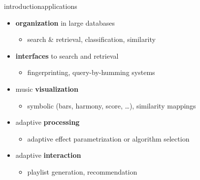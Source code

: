         \begin{frame}{introduction}{applications}
            \begin{itemize}
                \item	\textbf{organization} in large databases
                    \begin{itemize}
                        \item   search \& retrieval, classification, similarity
                    \end{itemize}
                \smallskip
                \item<2->	\textbf{interfaces} to search and retrieval
                    \begin{itemize}
                        \item   fingerprinting, query-by-humming systems
                    \end{itemize}
                \smallskip
                \item<3->	music \textbf{visualization}
                    \begin{itemize}
                        \item   symbolic (bars, harmony, score, \ldots), similarity mappings
                    \end{itemize}
                \smallskip
                \item<4->	adaptive \textbf{processing}
                    \begin{itemize}
                        \item   adaptive effect parametrization or algorithm selection
                    \end{itemize}
                \smallskip
                \item<5->	adaptive \textbf{interaction}
                    \begin{itemize}
                        \item   playlist generation, recommendation
                    \end{itemize}
            \end{itemize}
        \end{frame}
